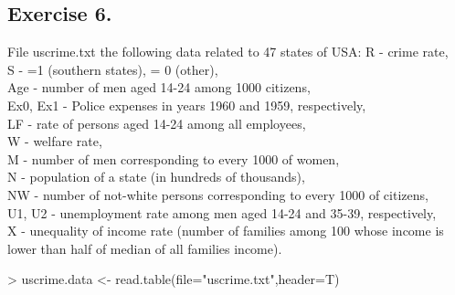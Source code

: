 \documentclass[a4paper]{article}
\begin{document}
\subsection{Exercise 6.} File uscrime.txt the following data related to 47
states of USA:
R - crime rate,\\
S - =1 (southern states), = 0 (other),\\
Age - number of men aged 14-24 among 1000 citizens,\\
Ex0, Ex1 - Police expenses in years 1960 and 1959, respectively,\\
LF - rate of persons aged 14-24 among all employees,\\
W - welfare rate,\\
M - number of men corresponding to every 1000 of women,\\
N - population of a state (in hundreds of thousands),\\
NW - number of not-white persons corresponding to every 1000 of citizens,\\
U1, U2 - unemployment rate among men aged 14-24 and 35-39, respectively,\\
X - unequality of income rate (number of families among 100 whose income is
lower than half of median of all families income).\\
\begin{Schunk}
\begin{Sinput}
> uscrime.data <- read.table(file="uscrime.txt",header=T)
\end{Sinput}
\end{Schunk}
\end{document}
